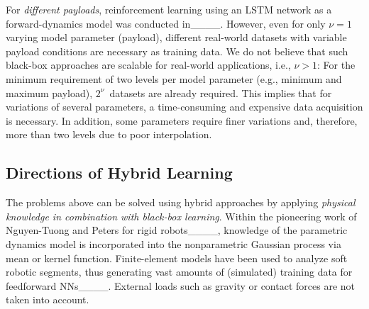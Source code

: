 For \textit{different payloads}, reinforcement learning using an LSTM network as a forward-dynamics model was conducted in____.
However, even for only $\nu{=}1$ varying model parameter (payload), different real-world datasets with variable payload conditions are necessary as training data.
We do not believe that such black-box approaches are scalable for real-world applications, i.e., $\nu{>}1$: 
For the minimum requirement of two levels per model parameter (e.g., minimum and maximum payload), $2^{\nu}$~datasets are already required.
This implies that for variations of several parameters, a time-consuming and expensive data acquisition is necessary.
In addition, some parameters require finer variations and, therefore, more than two levels due to poor interpolation.  
 \subsection{Directions of Hybrid Learning}
The problems above can be solved using hybrid approaches by applying \textit{physical knowledge in combination with black-box learning}. 
Within the pioneering work of Nguyen-Tuong and Peters for rigid robots____, knowledge of the parametric dynamics model is incorporated into the nonparametric Gaussian process via mean or kernel function. 
Finite-element models have been used to analyze soft robotic segments, thus generating vast amounts of (simulated) training data for feedforward NNs____. 
External loads such as gravity or contact forces are not taken into account. 


